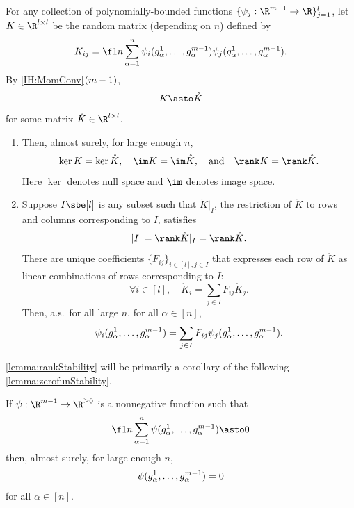 \documentclass[main.tex]{subfiles}
\begin{document}
\begin{lemma}\label{lemma:rankStability}
For any collection of polynomially-bounded functions $\{\psi_j: \R^{\MM-1} \to \R\}_{j=1}^l$, let $K \in \R^{l \times l}$ be the random matrix (depending on $n$) defined by
\begin{equation*}
K_{ij} = \f 1 n \sum_{\alpha=1}^n \psi_i(g^1_\alpha, \ldots, g^{\MM-1}_\alpha) \psi_j(g^1_\alpha, \ldots, g^{\MM-1}_\alpha).
\end{equation*}
By \ref{IH:MomConv}$(m-1)$,
\[K \asto \mathring K\]
for some matrix $\mathring K \in \R^{l \times l}$.
\begin{enumerate}
\item
    Then, almost surely, for large enough $n$,
    \begin{equation*}
    \ker K = \ker \mathring K, \quad \im K = \im \mathring K, \quad\text{and}\quad \rank K = \rank \mathring K.
    \end{equation*}
    Here $\ker$ denotes null space and $\im$ denotes image space.
\item
    Suppose $I \sbe [l]$ is any subset such that $\mathring K|_I$, the restriction of $\mathring K$ to rows and columns corresponding to $I$, satisfies
    \[|I| = \rank \mathring K|_I = \rank \mathring K.\]
    There are unique coefficients $\{F_{ij}\}_{i \in [l], j \in I}$ that expresses each row of $\mathring K$ as linear combinations of rows corresponding to $I$:
    \[
    \forall i \in [l],\quad 
    \mathring K_i = \sum_{j \in I} F_{ij} \mathring K_j.
    \]
    Then, a.s.\ for all large $n$, for all $\alpha \in [n]$,
    \begin{equation*}
    \psi_i(g^1_\alpha, \ldots, g^{m-1}_\alpha)
    = \sum_{j \in I} F_{ij} \psi_j(g^1_\alpha, \ldots, g^{m-1}_\alpha).
    \end{equation*}
\end{enumerate}

\end{lemma}

\cref{lemma:rankStability} will be primarily a corollary of the following \cref{lemma:zerofunStability}.

\begin{lemma}\label{lemma:zerofunStability}
If $\psi: \R^{\MM-1} \to \R^{\ge 0}$ is a nonnegative function such that
\begin{align*}
\f 1 n \sum_{\alpha = 1}^n \psi(g^1_\alpha, \ldots, g^{\MM-1}_\alpha) \asto 0
\end{align*}
then, almost surely, for large enough $n$,
\[\psi(g^1_\alpha, \ldots, g^{m-1}_\alpha) = 0\]
for all $\alpha \in [n]$.
\end{lemma}
\end{document}
